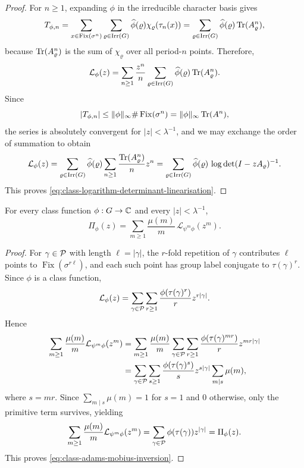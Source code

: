 \begin{proof}
  For \(n\ge 1\), expanding \(\phi\) in the irreducible character basis
  gives
  \[
    T_{\phi,n}
    =\sum_{x\in\operatorname{Fix}(\sigma^n)}
      \sum_{\varrho\in\operatorname{Irr}(G)}
        \widehat\phi(\varrho)\chi_\varrho(\tau_n(x))
    =\sum_{\varrho\in\operatorname{Irr}(G)}
      \widehat\phi(\varrho)\operatorname{Tr}(A_\varrho^n),
  \]
  because \(\operatorname{Tr}(A_\varrho^n)\) is the sum of \(\chi_\varrho\) over all
  period-\(n\) points. Therefore,
  \[
    \mathcal L_\phi(z)
    =\sum_{n\ge 1}\frac{z^n}{n}
      \sum_{\varrho\in\operatorname{Irr}(G)}
        \widehat\phi(\varrho)\operatorname{Tr}(A_\varrho^n).
  \]
  Since
  \[
    \lvert T_{\phi,n} \rvert
    \le \lVert \phi \rVert_\infty \#\operatorname{Fix}(\sigma^n)
    =\lVert \phi \rVert_\infty \operatorname{Tr}(A^n),
  \]
  the series is absolutely convergent for \(|z|<\lambda^{-1}\), and we
  may exchange the order of summation to obtain
  \[
    \mathcal L_\phi(z)
    =
    \sum_{\varrho\in\operatorname{Irr}(G)}
      \widehat\phi(\varrho)
      \sum_{n\ge 1}\frac{\operatorname{Tr}(A_\varrho^n)}{n}z^n
    =
    \sum_{\varrho\in\operatorname{Irr}(G)}
      \widehat\phi(\varrho)\,
      \log\det(I-zA_\varrho)^{-1}.
  \]
  This proves \eqref{eq:class-logarithm-determinant-linearisation}.
\end{proof}

\begin{corollary}
  \label{cor:class-function-adams-mobius}
  For every class function \(\phi:G\to\mathbb{C}\) and every \(|z|<\lambda^{-1}\),
  \begin{equation}\label{eq:class-adams-mobius-inversion}
    \Pi_\phi(z)
    =
    \sum_{m\ge 1}\frac{\mu(m)}{m}\,
      \mathcal L_{\psi^m\phi}(z^m).
  \end{equation}
\end{corollary}

\begin{proof}
  For \(\gamma\in\mathcal P\) with length \(\ell=|\gamma|\), the \(r\)-fold
  repetition of \(\gamma\) contributes \(\ell\) points to
  \(\operatorname{Fix}(\sigma^{r\ell})\), and each such point has group
  label conjugate to \(\tau(\gamma)^r\). Since \(\phi\) is a class
  function,
  \[
    \mathcal L_\phi(z)
    =
    \sum_{\gamma\in\mathcal P}\sum_{r\ge 1}
      \frac{\phi(\tau(\gamma)^r)}{r}z^{r|\gamma|}.
  \]
  Hence
  \begin{align*}
    \sum_{m\ge 1}\frac{\mu(m)}{m}\mathcal L_{\psi^m\phi}(z^m)
    &=
    \sum_{m\ge 1}\frac{\mu(m)}{m}
      \sum_{\gamma\in\mathcal P}\sum_{r\ge 1}
        \frac{\phi(\tau(\gamma)^{mr})}{r}z^{mr|\gamma|} \\
    &=
    \sum_{\gamma\in\mathcal P}\sum_{s\ge 1}
      \frac{\phi(\tau(\gamma)^s)}{s}z^{s|\gamma|}
      \sum_{m\mid s}\mu(m),
  \end{align*}
  where \(s=mr\). Since \(\sum_{m\mid s}\mu(m)=1\) for \(s=1\) and
  \(0\) otherwise, only the primitive term survives, yielding
  \[
    \sum_{m\ge 1}\frac{\mu(m)}{m}\mathcal L_{\psi^m\phi}(z^m)
    =
    \sum_{\gamma\in\mathcal P}\phi(\tau(\gamma))z^{|\gamma|}
    =\Pi_\phi(z).
  \]
  This proves \eqref{eq:class-adams-mobius-inversion}.
\end{proof}

